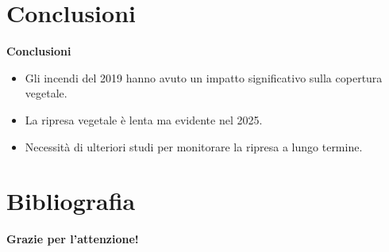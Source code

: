 \documentclass{beamer}
\begin{document}
\section{Conclusioni}
\begin{frame}{\textbf{Conclusioni}}
\begin{itemize}
    \item Gli incendi del 2019 hanno avuto un impatto significativo sulla copertura vegetale.
    \item La ripresa vegetale è lenta ma evidente nel 2025.
    \item Necessità di ulteriori studi per monitorare la ripresa a lungo termine.
\end{itemize}
\end{frame}

\section{Bibliografia}

\begin{frame}{}
\centering
\textbf{Grazie per l'attenzione!}
\end{frame}
\end{document}

